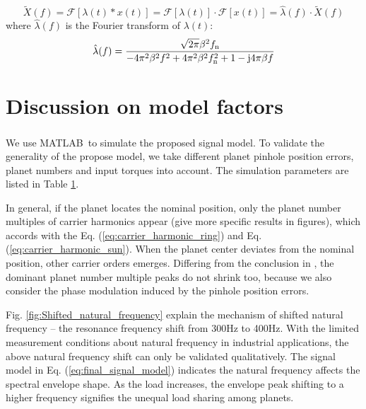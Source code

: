 \documentclass[a4paper,fleqn]{cas-sc}%
\begin{document}
\begin{equation}
        \widetilde{X}(f)= \mathcal{F}\left[\lambda(t) \ast x(t) \right]
                    = \mathcal{F}\left[\lambda(t)\right] \cdot \mathcal{F}\left[x(t)\right]
                    = \hat{\lambda}(f) \cdot \widetilde{X}(f)
\end{equation}
where $\hat{\lambda}(f)$ is the Fourier transform of $\lambda(t)$:
\begin{equation}
    \hat{\lambda}(f)=\frac{\sqrt{2 \pi } \beta ^2 f_{\rm n}}{-4 \pi ^2 \beta ^2 f^2  + 4 \pi ^2 \beta ^2 f_{\rm n}^2+1 - {\rm j} 4 \pi  \beta  f}
\end{equation}
\section{Discussion on model factors\label{sec:factor_discussion}}
\par We use MATLAB\textsuperscript \textregistered \ to simulate the proposed signal model. To validate the generality of the propose model, we take different planet pinhole position errors, planet numbers and input torques into account. The simulation parameters are listed in Table \ref{}.
\par In general, if the planet locates the nominal position, only the planet number multiples of carrier harmonics appear (give more specific results in figures), which accords with the Eq. (\ref{eq:carrier_harmonic_ring}) and Eq. (\ref{eq:carrier_harmonic_sun}). When the planet center deviates from the nominal position, other carrier orders emerges. Differing from the conclusion in \cite{Mark2009}, the dominant planet number multiple peaks do not shrink too, because we also consider the phase modulation induced by the pinhole position errors. 
\par Fig. \ref{fig:Shifted_natural_frequency} explain the mechanism of shifted natural frequency -- the resonance frequency shift from 300Hz to 400Hz. With the limited measurement conditions about natural frequency in industrial applications, the above natural frequency shift can only be validated qualitatively. The signal model in Eq. (\ref{eq:final_signal_model}) indicates the natural frequency affects the spectral envelope shape. As the load increases, the envelope peak shifting to a higher frequency signifies the unequal load sharing among planets. 
\end{document}

